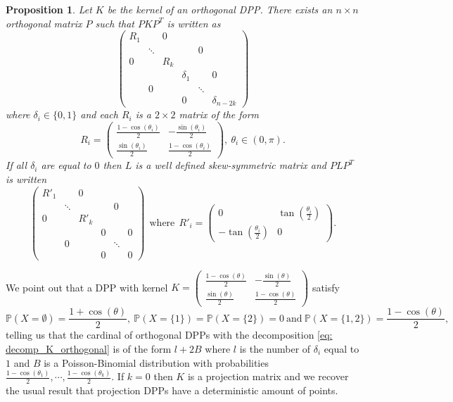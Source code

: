 \documentclass{article}
\numberwithin{equation}{section}
\theoremstyle{plain}
\newtheorem{proposition}{Proposition}[section]
\begin{document}
\begin{proposition}\label{prop: decomp_K_orthogonal}
Let $K$ be the kernel of an orthogonal DPP. There exists an $n\times n$ orthogonal matrix $P$ such that $PKP^T$ is written as
\begin{equation}\label{eq: decomp_K_orthogonal}
\begin{pmatrix}
R_1 & & 0 & & & \\
 & \ddots & & & 0 & \\
 0 & & R_k & & & \\
 & & & \delta_1 & & 0 \\
 & 0 & & & \ddots & \\
 & & & 0 & & \delta_{n-2k}
\end{pmatrix}
\end{equation}
where $\delta_i\in\{0, 1\}$ and each $R_i$ is a $2\times 2$ matrix of the form
\[R_i=\begin{pmatrix}
\frac{1-\cos(\theta_i)}{2} & -\frac{\sin(\theta_i)}{2}\\
\frac{\sin(\theta_i)}{2} & \frac{1-\cos(\theta_i)}{2}
\end{pmatrix},~\theta_i\in (0,\pi).\]
If all $\delta_i$ are equal to $0$ then $L$ is a well defined skew-symmetric matrix and $PLP^T$ is written
\begin{equation}\label{eq: decomp_L_orthogonal}
\begin{pmatrix}
R'_1 & & 0 & & & \\
 & \ddots & & & 0 & \\
 0 & & R'_k & & & \\
 & & & 0 & & 0 \\
 & 0 & & & \ddots & \\
 & & & 0 & & 0
\end{pmatrix}~~\mbox{where}~~R'_i=\begin{pmatrix}
0 & \tan\left(\frac{\theta_i}{2}\right)\\
-\tan\left(\frac{\theta_i}{2}\right) & 0
\end{pmatrix}.
\end{equation}
\end{proposition}

\noindent We point out that a DPP with kernel $K=\begin{pmatrix}\frac{1-\cos(\theta)}{2} & -\frac{\sin(\theta)}{2}\\
\frac{\sin(\theta)}{2} & \frac{1-\cos(\theta)}{2}
\end{pmatrix}$ satisfy
\[\mathbb{P}(X=\emptyset)=\frac{1+\cos(\theta)}{2},~\mathbb{P}(X=\{1\})=\mathbb{P}(X=\{2\})=0~\mbox{and}~\mathbb{P}(X=\{1, 2\})=\frac{1-\cos(\theta)}{2},\]
telling us that the cardinal of orthogonal DPPs with the decomposition \eqref{eq: decomp_K_orthogonal} is of the form $l+2B$ where $l$ is the number of $\delta_i$ equal to $1$ and $B$ is a Poisson-Binomial distribution with probabilities $\frac{1-\cos(\theta_1)}{2},\cdots,\frac{1-\cos(\theta_k)}{2}$. If $k=0$ then $K$ is a projection matrix and we recover the usual result that projection DPPs have a deterministic amount of points.
\end{document}
